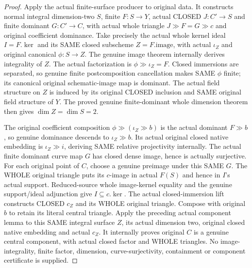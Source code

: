 \begin{proof}
Apply the actual finite-surface producer to original data. It constructs
normal integral dimension-two $S$, finite $F:S\to Y$, actual CLOSED
$J:C'\to S$ and finite dominant $G:C'\to C$, with actual whole
triangle $J\gg F=G\gg c$ and original coefficient dominance.
Take precisely the actual whole kernel ideal $I=F.\ker$ and its SAME
closed subscheme $Z=F.\mathrm{image}$, with actual $\iota_Z$ and
original canonical $\phi:S\to Z$. The genuine image theorem internally
derives integrality of $Z$. The actual factorization is
$\phi\gg\iota_Z=F$. Closed immersions are separated, so genuine finite
postcomposition cancellation makes SAME $\phi$ finite; its canonical
original schematic-image map is dominant. The actual field structure
on $Z$ is induced by its original CLOSED inclusion and SAME original
field structure of $Y$. The proved genuine finite-dominant whole
dimension theorem then gives $\dim Z=\dim S=2$.

The original coefficient composition $\phi\gg(\iota_Z\gg b)$ is the
actual dominant $F\gg b$, so genuine dominance descends to
$\iota_Z\gg b$. Its actual original closed native embedding is
$\iota_Z\gg i$, deriving SAME relative projectivity internally.
The actual finite dominant curve map $G$ has closed dense image,
hence is actually surjective. For each original point of $C$, choose
a genuine preimage under this SAME $G$. The WHOLE original triangle
puts its $c$-image in actual $F(S)$ and hence in $I$'s actual support.
Reduced-source whole image-kernel equality and the genuine support/ideal
adjunction give $I\subseteq c.\ker$. The actual closed-immersion lift
constructs CLOSED $c_Z$ and its WHOLE original triangle. Compose with
original $b$ to retain its literal central triangle.
Apply the preceding actual component lemma to this SAME integral
surface $Z$, its actual dimension two, original closed native embedding
and actual $c_Z$. It internally proves original $C$ is a genuine
central component, with actual closed factor and WHOLE triangles.
No image-integrality, finite factor, dimension, curve-surjectivity,
containment or component certificate is supplied.
\end{proof}

